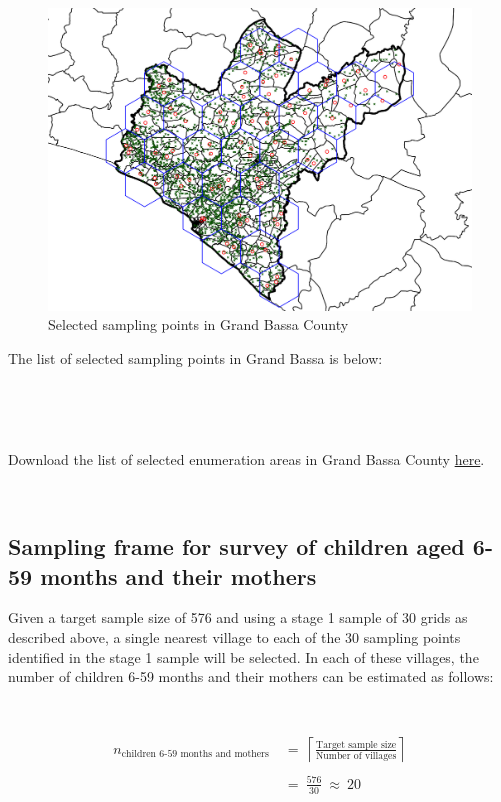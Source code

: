 \documentclass[12pt,a4paper]{book}
\theoremstyle{definition}
\theoremstyle{definition}
\theoremstyle{definition}
\theoremstyle{remark}
\let\BeginKnitrBlock\begin \let\EndKnitrBlock\end
\begin{document}
\begin{figure}[H]

\includegraphics{figures/sample25-1} \hfill{}

\caption{Selected sampling points in Grand Bassa County}\label{fig:sample25}
\end{figure}

\newpage

The list of selected sampling points in Grand Bassa is below:

~

~

\BeginKnitrBlock{rmddownload}
Download the list of selected enumeration areas in Grand Bassa County
\href{data/grandBassaSPlist.csv}{here}.
\EndKnitrBlock{rmddownload}

~

\hypertarget{sampling-frame-for-survey-of-children-aged-6-59-months-and-their-mothers}{%
\subsection{Sampling frame for survey of children aged 6-59 months and
their
mothers}\label{sampling-frame-for-survey-of-children-aged-6-59-months-and-their-mothers}}

Given a target sample size of 576 and using a stage 1 sample of 30 grids
as described above, a single nearest village to each of the 30 sampling
points identified in the stage 1 sample will be selected. In each of
these villages, the number of children 6-59 months and their mothers can
be estimated as follows:

~

\[\begin{aligned} 
n_{\text{children 6-59 months and mothers}} & ~ = ~ \left \lceil \frac{\text{Target sample size}}{\text{Number of villages}} \right \rceil \\
\\
& ~ = ~ \frac{576}{30} ~ \approx ~ 20
\end{aligned}\]
\end{document}
